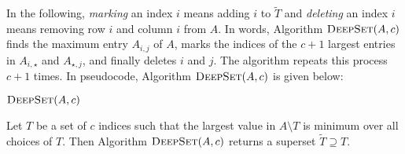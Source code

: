 \documentclass{elsart}
\newcommand{\RETURN}[1]{\STATE{\textbf{return} #1}}
\begin{document}
In the following, \emph{marking} an index $i$ means adding $i$ to
$\tilde{T}$ and \emph{deleting} an index $i$ means removing row $i$
and column $i$ from $A$.  In words, Algorithm $\textsc{DeepSet}(A,c)$
finds the maximum entry $A_{i,j}$ of $A$, marks the indices of the
$c+1$ largest entries in $A_{i,\star}$ and $A_{\star,j}$, and finally deletes
$i$ and $j$.  The algorithm repeats this process $c+1$ times.  In
pseudocode, Algorithm $\textsc{DeepSet}(A,c)$ is given 
below:

\noindent
\begin{minipage}{\textwidth}
\noindent$\textsc{DeepSet}(A,c)$
\begin{algorithmic}[1]
\ENDFOR
\RETURN{$\tilde{T}$}
\end{algorithmic}
\end{minipage}
\vspace{\parskip}

\begin{lem}
Let $T$ be a set of $c$ indices such that the largest value in
$A\setminus T$ is minimum over all choices of $T$.  Then
Algorithm $\textsc{DeepSet}(A,c)$ returns a superset
$\tilde{T}\supseteq T$.
\end{lem}
\end{document}
